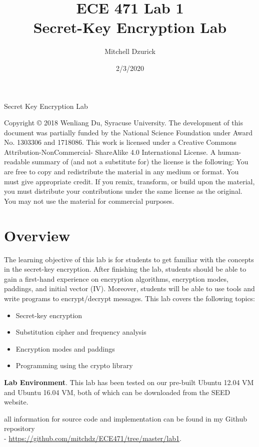\documentclass[12pt]{article}
\title {{\bf ECE 471 Lab 1} \\
\large{Secret-Key Encryption Lab}}
\author{Mitchell Dzurick}
\date{2/3/2020}
\newcommand\tab[1][0.5cm]{\hspace*{#1}}
\begin{document}
\maketitle

\tableofcontents

\clearpage


Secret Key Encryption Lab

Copyright © 2018 Wenliang Du, Syracuse University. The development of this document was partially funded by the National Science Foundation under Award No. 1303306 and 1718086. This work is licensed under a Creative Commons Attribution-NonCommercial- ShareAlike 4.0 International License. A human-readable summary of (and not a substitute for) the license is the following: You are free to copy and redistribute the material in any medium or format. You must give appropriate credit. If you remix, transform, or build upon the material, you must distribute your contributions under the same license as the original. You may not use the material for commercial purposes.

\section{Overview}

The learning objective of this lab is for students to get familiar with the concepts in the secret-key encryption. After finishing the lab, students should be able to gain a first-hand experience on encryption algorithms, encryption modes, paddings, and initial vector (IV). Moreover, students will be able to use tools and write programs to encrypt/decrypt messages. This lab covers the following topics:

    \begin{itemize}
        \item Secret-key encryption
        \item Substitution cipher and frequency analysis
        \item Encryption modes and paddings
        \item Programming using the crypto library
    \end{itemize}

\textbf{Lab Environment}. This lab has been tested on our pre-built Ubuntu 12.04 VM and Ubuntu 16.04 VM, both of which can be downloaded from the SEED website.

all information for source code and implementation can be found in my Github repository \\
\tab - \url{https://github.com/mitchdz/ECE471/tree/master/lab1}.
\end{document}
